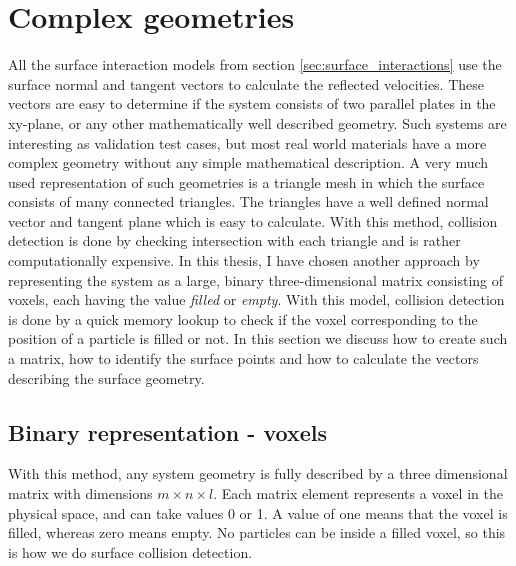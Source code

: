 \section{Complex geometries}
\label{sec:dsmc_complex_geometries}
All the surface interaction models from section \ref{sec:surface_interactions} use the surface normal and tangent vectors to calculate the reflected velocities. These vectors are easy to determine if the system consists of two parallel plates in the xy-plane, or any other mathematically well described geometry. Such systems are interesting as validation test cases, but most real world materials have a more complex geometry without any simple mathematical description. A very much used representation of such geometries is a triangle mesh in which the surface consists of many connected triangles. The triangles have a well defined normal vector and tangent plane which is easy to calculate. With this method, collision detection is done by checking intersection with each triangle and is rather computationally expensive. In this thesis, I have chosen another approach by representing the system as a large, binary three-dimensional matrix consisting of voxels, each having the value \textit{filled} or \textit{empty}. With this model, collision detection is done by a quick memory lookup to check if the voxel corresponding to the position of a particle is filled or not. In this section we discuss how to create such a matrix, how to identify the surface points and how to calculate the vectors describing the surface geometry.

\subsection{Binary representation - voxels}
\label{sec:dsmc_binary_representation}
With this method, any system geometry is fully described by a three dimensional matrix with dimensions $m\times n\times l$. Each matrix element represents a voxel in the physical space, and can take values 0 or 1. A value of one means that the voxel is filled, whereas zero means empty. No particles can be inside a filled voxel, so this is how we do surface collision detection. 
